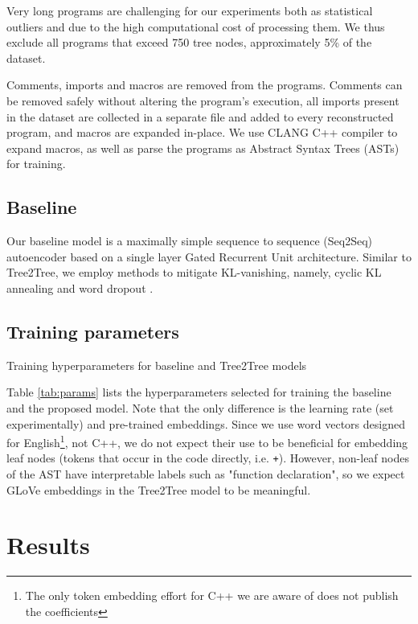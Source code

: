 Very long programs are challenging for our experiments both as statistical outliers and due to the high computational cost of processing them. We thus exclude all programs that exceed 750 tree nodes, approximately 5\% of the dataset.

Comments, imports and macros are removed from the programs.
Comments can be removed safely without altering the program's execution, all imports present in the dataset are collected in a separate file and added to every reconstructed program, and macros are expanded in-place.
We use CLANG C++ compiler to expand macros, as well as parse the programs as Abstract Syntax Trees (ASTs) for training.

\subsection{Baseline}

Our baseline model is a maximally simple sequence to sequence (Seq2Seq) autoencoder based on a single layer Gated Recurrent Unit \cite{chung2014empirical} architecture. Similar to Tree2Tree, we employ methods to mitigate KL-vanishing, namely, cyclic KL annealing \cite{fu2019cyclical} and word dropout \cite{bowman2015generating}.

\subsection{Training parameters}

\begin{table}
\centering

\caption{Training hyperparameters for baseline and Tree2Tree models}
\label{tab:params}
\end{table}

Table \ref{tab:params} lists the hyperparameters selected for training the baseline and the proposed model.
Note that the only difference is the learning rate (set experimentally) and pre-trained embeddings.
Since we use word vectors designed for English\footnote{The only token embedding effort for C++ we are aware of \cite{harerAutomatedSoftwareVulnerability2018} does not publish the coefficients}, not C++, we do not expect their use to be beneficial for embedding leaf nodes (tokens that occur in the code directly, i.e. \verb|+|).
However, non-leaf nodes of the AST have interpretable labels such as "function declaration", so we expect GLoVe \cite{pennington2014glove} embeddings in the Tree2Tree model to be meaningful.

\newpage
\section{Results}
\label{sec:tree2tree-results}

